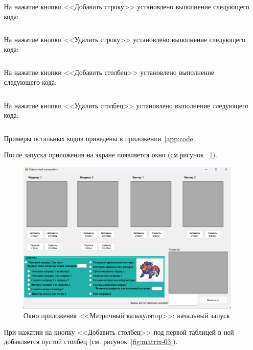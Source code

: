 \documentclass[bachelor, och, pract, times]{SCWorks}
\begin{document}
На нажатие кнопки <<Добавить строку>> установлено выполнение следующего кода:
\inputminted[fontsize=\footnotesize]{cpp}{КодМатрикс/AddString.cpp}

На нажатие кнопки <<Удалить строку>> установлено выполнение следующего кода:
\inputminted[fontsize=\footnotesize]{cpp}{КодМатрикс/DeleteString.cpp}

На нажатие кнопки <<Добавить столбец>> установлено выполнение следующего кода:
\inputminted[fontsize=\footnotesize]{cpp}{КодМатрикс/AddCol.cpp}

На нажатие кнопки <<Удалить столбец>> установлено выполнение следующего кода:
\inputminted[fontsize=\footnotesize]{cpp}{КодМатрикс/Deletezcol.cpp}

Примеры остальных кодов приведены в приложении~\ref{app:code}.

После запуска приложения на экране появляется окно (см.рисунок ~\ref{fig:matrix-02}).

\begin{figure}[H]
    \centering
    \includegraphics[scale=0.4]{Скрины/Снимок экрана 2025-01-05 131634.png}
    \caption{Окно приложения <<Матричный калькулятор>>: начальный запуск}\label{fig:matrix-02}
\end{figure}

При нажатии на кнопку <<Добавить столбец>> под первой таблицей в ней добавляется пустой столбец (см. рисунок~\ref{fig:matrix-03}).
\end{document}
